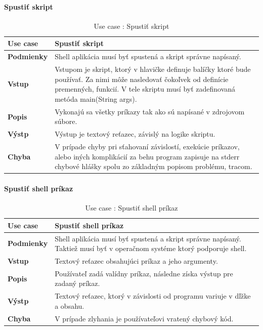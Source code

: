 \paragraph{Spustiť skript}
\begin{center}
	\begin{table}[htbp]
		\begin{tabular}{|p{2.5cm}|p{14cm}|}
			\hline
			\textbf{Use case} & Spustiť skript \\ 
			\hline
			\textbf{Podmienky} & Shell aplikácia musí byť spustená a skript správne napísaný.\\ 
			\hline
			\textbf{Vstup} & Vstupom je skript, ktorý v hlavičke definuje balíčky ktoré bude používať. Za nimi môže nasledovať čokoľvek od definície premenných, funkcií. V tele skriptu musí byť zadefinovaná metóda main(String args).\\
			\hline
			\textbf{Popis} & Vykonajú sa všetky príkazy tak ako sú napísané v zdrojovom súbore. \\ 
			\hline
			\textbf{Výstp} & Výstup je textový reťazec, závislý na logike skriptu.\\
			\hline
			\textbf{Chyba} & V prípade chyby pri sťahovaní závislostí, exekúcie príkazov, alebo iných komplikácií za behu program zapisuje na stderr chybové hlášky spolu zo základným popisom problému, tracom.\\
			\hline
		\end{tabular}
	\label{table:1}
	\caption{Use case : Spustiť skript}
	\end{table}
\end{center}
\newpage
\paragraph{Spustiť shell príkaz}
\begin{center}
	\begin{table}[htbp]
		\begin{tabular}{|p{2.5cm}|p{14cm}|}
			\hline
			\textbf{Use case} & Spustiť shell príkaz \\ 
			\hline
			\textbf{Podmienky} & Shell aplikácia musí byť spustená a skript správne napísaný. Taktiež musí byť v operačnom systéme ktorý podporuje shell. \\ 
			\hline
			\textbf{Vstup} & Textový reťazec obsahujúci príkaz a jeho argumenty.\\
			\hline
			\textbf{Popis} & Používateľ zadá valídny príkaz, následne získa výstup pre zadaný príkaz. \\ 
			\hline
			\textbf{Výstp} &Textový reťazec, ktorý v závislosti od programu variuje v dľžke a obsahu. \\
			\hline
			\textbf{Chyba} & V prípade zlyhania je používateľovi vratený chybový kód.\\
			\hline
		\end{tabular}
	\label{table:1}
	\caption{Use case : Spustiť shell príkaz}
	\end{table}
\end{center}
